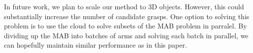 \documentclass[10pt, conference]{ieeeconf}      %
\begin{document}
In future work, we plan to scale our method to 3D objects. However, this could substantially increase the number of candidate grasps. One option to solving this problem is to use the cloud to solve subsets of the MAB problem in parralel. By dividing up the MAB into batches of arms and solving each batch in parallel, we can hopefully maintain similar performance as in this paper. 



\end{document}
